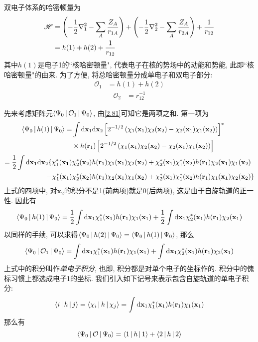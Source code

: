 双电子体系的哈密顿量为
\begin{align}
\mathscr{H}&=\left( -\frac{1}{2}\nabla_1^2 - \sum_A\frac{Z_A}{r_{1A}} \right) + \left( -\frac{1}{2}\nabla_2^2 - \sum_A\frac{Z_A}{r_{2A}} \right) + \frac{1}{r_{12}}\notag\\
&=h(1) + h(2) + \frac{1}{r_{12}}
\end{align}
其中$h(1)$是电子1的``核哈密顿量", 
代表电子在核的势场中的动能和势能, 
此即``核哈密顿量"的由来. 
为了方便, 
将总哈密顿量分成单电子和双电子部分:
\begin{align}
\mathcal{O}_1&=h(1)+h(2)
\label{2.81}
\end{align}
\begin{align}
\mathcal{O}_2&=r_{12}^{-1}
\end{align}

先来考虑矩阵元$\Braket{\Psi_0|\mathcal{O}_1|\Psi_0}$, 
由\eqref{2.81}可知它是两项之和. 
第一项为
\begin{align}
\braket{\Psi_0|h(1)|\Psi_0}=&\int\db{x}_1\db{x}_2\left[2^{-1/2}\left(\chi_1(\mathbf{x}_1)\chi_2(\mathbf{x}_2)-\chi_2(\mathbf{x}_1)\chi_1(\mathbf{x}_2)\right)\right]^*\notag\\
\qquad&\times h(\mathbf{r}_1)\left[ 2^{-1/2}\left(\chi_1(\mathbf{x}_1)\chi_2(\mathbf{x}_2)-\chi_2(\mathbf{x}_1)\chi_1(\mathbf{x}_2)\right)\right]\notag\\
=\frac{1}{2}\int\dd{\mathbf{x}_1}\dd\mathbf{x}_2\{\chi_1^*(\mathbf{x_1})&\chi_2^*(\mathbf{x}_2)h(\mathbf{r}_1)\chi_1(\mathbf{x}_1)\chi_2(\mathbf{x}_2) + \chi_2^*(\mathbf{x}_1)\chi_1^*(\mathbf{x}_2)h(\mathbf{r}_1)\chi_2(\mathbf{x_1})\chi_1(\mathbf{x}_2) \notag\\
 - \chi_1^*(\mathbf{x}_1)&\chi_2^*(\mathbf{x}_2)h(\mathbf{r}_1)\chi_2(\mathbf{x}_1)\chi_1(\mathbf{x}_2) + \chi_2^*(\mathbf{x}_1)\chi_1^*(\mathbf{x}_2)h(\mathbf{r}_1)\chi_1(\mathbf{x_1})\chi_2(\mathbf{x}_2)
\}
\end{align}
上式的四项中, 
对$\mathbf{x}_2$的积分不是1(前两项)就是0(后两项), 
这是由于自旋轨道的正一性. 
因此有
\begin{equation}
\braket{\Psi_0|h(1)|\Psi_0}=\frac{1}{2}\int\dd\mathbf{x}_1\chi_1^*(\mathbf{x}_1)h(\mathbf{r}_1)\chi_1(\mathbf{x}_1)+\frac{1}{2}\int\dd\mathbf{x}_1\chi_2^*(\mathbf{x}_1)h(\mathbf{r}_1)\chi_2(\mathbf{x}_1)
\end{equation}
以同样的手续, 
可以求得$\Braket{\Psi_0|h(2)|\Psi_0}=\Braket{\Psi_0|h(1)|\Psi_0}$, 
那么
\begin{equation}
\braket{\Psi_0|\mathcal{O}_1|\Psi_0}=\int\dd\mathbf{x}_1\chi_1^*(\mathbf{x}_1)h(\mathbf{r}_1)\chi_1(\mathbf{x}_1) + \int\dd\mathbf{x}_1\chi_2^*(\mathbf{x}_1)h(\mathbf{r}_1)\chi_2(\mathbf{x}_1)
\end{equation}
上式中的积分叫作\emph{单电子积分}, 
也即, 
积分都是对单个电子的坐标作的. 
积分中的傀标习惯上都选成电子1的坐标. 
我们引入如下记号来表示包含自旋轨道的单电子积分:
\begin{equation}
\braket{i|h|j}=\braket{\chi_i|h|\chi_j}=\int\dd\mathbf{x}_1\chi_1^*(\mathbf{x}_1)h(\mathbf{r}_1)\chi_1(\mathbf{x}_1)
\end{equation}
那么有
\begin{equation}
\Braket{\Psi_0|\mathcal{O}|\Psi_0}=\Braket{1|h|1}+\Braket{2|h|2}
\end{equation}

